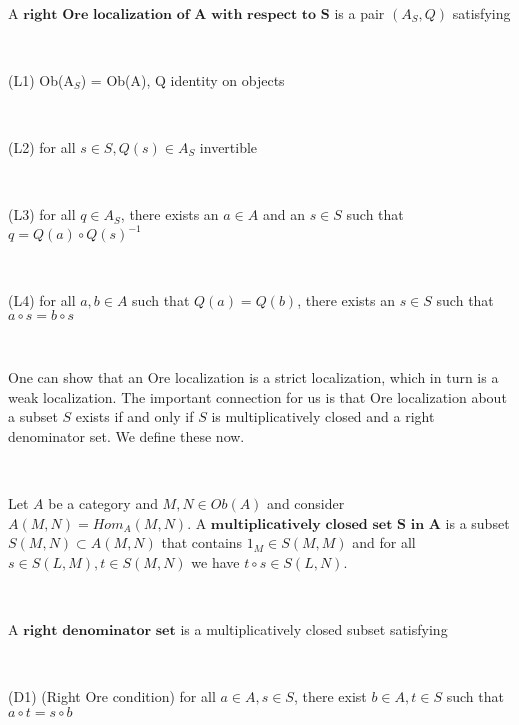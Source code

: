 \documentclass[12pt]{amsart}    %
\theoremstyle{definition}
\begin{document}
\

A $\textbf{right Ore localization of A with respect to S}$ is a pair $(A_S, Q)$ satisfying 

\

(L1) Ob(A$_S$) = Ob(A), Q identity on objects

\

(L2) for all $s \in S, Q(s) \in A_S$ invertible

\

(L3) for all $q \in A_S$, there exists an $a \in A$ and an $s \in S$ such that $q = Q(a) \circ Q(s)^{-1}$

\

(L4) for all $a, b \in A$ such that $Q(a) = Q(b)$, there exists an $s \in S$ such that $a \circ s = b \circ s$

\


One can show that an Ore localization is a strict localization, which in turn is a weak localization.  The important connection for us is that Ore localization about a subset $S$ exists if and only if $S$ is multiplicatively closed and a right denominator set.  We define these now.

\

Let $A$ be a category and $M, N \in Ob(A)$ and consider $A(M,N) = Hom_A(M,N)$.  A $\textbf{multiplicatively closed set S in A}$ is a subset $S(M,N) \subset A(M,N)$ that contains $1_M \in S(M,M)$ and for all $s \in S(L,M), t \in S(M,N)$ we have $t \circ s \in S(L,N)$.  


\

A $\textbf{right denominator set}$ is a multiplicatively closed subset satisfying

\

(D1) (Right Ore condition) for all $a \in A, s \in S$, there exist  $b \in A, t \in S$ such that $a \circ t = s \circ b$

\begin{center}
\

\end{center}
\end{document}
